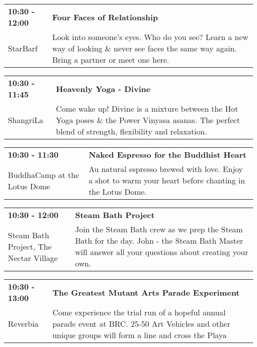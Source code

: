 \begin{tabular}{ p{1in} p{2.2in} }
    \textbf{10:30 - 12:00} & \textbf{Four Faces of Relationship} \\
    StarBarf \newline  & Look into someone's eyes. Who do you see? Learn a new way of looking \& never see faces the same way again. Bring a partner or meet one here. \\
    \hline 
\end{tabular}
    
\begin{tabular}{ p{1in} p{2.2in} }
    \textbf{10:30 - 11:45} & \textbf{Heavenly Yoga - Divine} \\
    ShangriLa \newline  & Come wake up! Divine is a mixture between the Hot Yoga poses \& the Power Vinyasa asanas. The perfect blend of strength, flexibility and relaxation. \\
    \hline 
\end{tabular}
    
\begin{tabular}{ p{1in} p{2.2in} }
    \textbf{10:30 - 11:30} & \textbf{Naked Espresso for the Buddhist Heart} \\
    BuddhaCamp at the Lotus Dome \newline  & Au natural espresso brewed with love.  Enjoy a shot to warm your heart before  chanting in the Lotus Dome. \\
    \hline 
\end{tabular}
    
\begin{tabular}{ p{1in} p{2.2in} }
    \textbf{10:30 - 12:00} & \textbf{Steam Bath Project} \\
    Steam Bath Project, The \newline Nectar Village & Join the Steam Bath crew as we prep the Steam Bath for the day. John - the Steam Bath Master will answer all your questions about creating your own. \\
    \hline 
\end{tabular}
    
\begin{tabular}{ p{1in} p{2.2in} }
    \textbf{10:30 - 13:00} & \textbf{The Greatest Mutant Arts Parade Experiment} \\
    Reverbia \newline  & Come experience the trial run of a hopeful annual parade event at BRC. 25-50 Art Vehicles and other unique groups will form a line and cross the Playa \\
    \hline 
\end{tabular}
    
